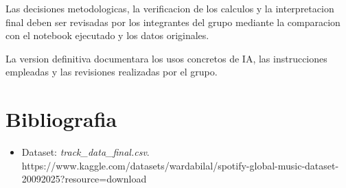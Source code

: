 \documentclass[11pt,a4paper]{article}
\begin{document}
Las decisiones metodologicas, la verificacion de los
calculos y la interpretacion final deben ser revisadas
por los integrantes del grupo mediante la comparacion
con el notebook ejecutado y los datos originales.

La version definitiva documentara los usos concretos
de IA, las instrucciones empleadas y las revisiones
realizadas por el grupo.

\section{Bibliografia}

\begin{itemize}
    \item Dataset: \textit{track\_data\_final.csv}.
    https://www.kaggle.com/datasets/wardabilal/spotify-global-music-dataset-20092025?resource=download


\end{itemize}
\end{document}
